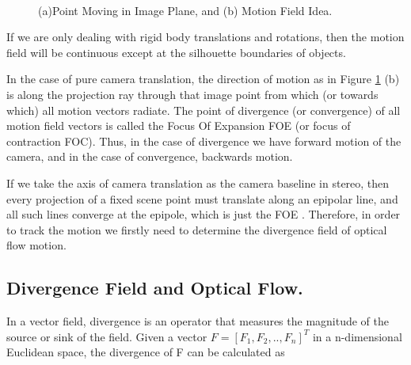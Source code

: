 \begin{figure}[h]
\begin{dBox}
\centering
  \mbox{
   }
   \caption{(a)Point Moving in Image Plane, and (b) Motion Field Idea. \label{fig:dynamic12} }   
\end{dBox}   
\end{figure}

If we are only dealing with rigid body translations and rotations, then the motion field will be continuous except at the silhouette boundaries of objects.\bigskip

In the case of pure camera translation, the direction of motion as in Figure \ref{fig:dynamic12} (b) is along the projection ray through that image point from which (or towards which) all motion vectors radiate. The point of divergence (or convergence) of all motion field vectors is called the Focus Of Expansion FOE (or focus of contraction FOC). Thus, in the case of divergence we have forward motion of the camera, and in the case of convergence, backwards motion.\bigskip

If we take the axis of camera translation as the camera baseline in stereo, then every projection of a fixed scene point must translate along an epipolar line, and all such lines converge at the epipole, which is just the FOE \cite{dynamic1}.  Therefore, in order to track the motion we firstly need to determine the divergence field of optical flow motion.\bigskip


\subsection{Divergence Field and Optical Flow.}
In a vector field, divergence is an operator that measures the magnitude of the source or sink of the field. Given a vector $F=[F_1,F_2,..,F_n]^T$ in a n-dimensional Euclidean space, the divergence of F can be calculated as \bigskip

